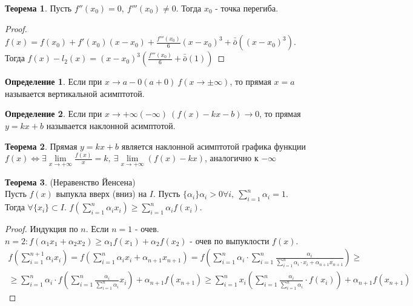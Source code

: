 \documentclass[a4paper, 12pt]{article}
\theoremstyle{definition}
\newtheorem*{definition}{Определение}
\newtheorem*{theorem}{Теорема}
\begin{document}
        \begin{theorem}
            Пусть $f''(x_0)=0,\ f'''(x_0)\ne 0$. Тогда $x_0$ - точка перегиба.
        \end{theorem} 
        \begin{proof}
            $f(x)=f(x_0)+f'(x_0)(x-x_0)+\frac{f'''(x_0)}{6}(x-x_0)^3+\bar{\bar{o}}{((x-x_0)^3)}$. Тогда $f(x)-l_2(x)=(x-x_0)^3(\frac{f'''(x_0)}{6}+\bar{\bar{o}}{(1)})$
        \end{proof} 
        \begin{definition}
            Если при $x\to a-0 (a+0)\ f(x\to \pm \infty)$, то прямая $x=a$ называется вертикальной асимптотой.
        \end{definition} 
        \begin{definition}
            Если при $x\to +\infty (-\infty)\ (f(x)-kx-b)\to 0$, то прямая $y=kx+b$ называется наклонной асимптотой.
        \end{definition} 
        \begin{theorem}
            Прямая $y=kx+b$ является наклонной асимптотой графика функции $f(x) \Leftrightarrow \exists \lim\limits_{x\to +\infty}\frac{f(x)}{x}=k,\ \exists \lim\limits_{x\to +\infty}(f(x)-kx)$, аналогично к $-\infty$
        \end{theorem} 
        \begin{theorem} (Неравенство Йенсена)\\
            Пусть $f(x)$ выпукла вверх (вниз) на $I$. Пусть $\{\alpha_i\} \alpha_i>0 \forall i,\ \sum\limits_{i=1}^{n}\alpha_i=1$. Тогда $\forall \{x_i\} \subset I$. $f(\sum\limits_{i=1}^{n}\alpha_i x_i) \geq \sum\limits_{i=1}^{n}\alpha_i f(x_i)$.
        \end{theorem} 
        \begin{proof}
            Индукция по $n$. Если $n=1$ - очев.\\
            $n=2: f(\alpha_1 x_1+\alpha_2 x_2)\geq \alpha_1 f(x_1)+\alpha_2 f(x_2)$ - очев по выпуклости $f(x)$.
            \begin{multline*}
                f(\sum\limits_{i=1}^{n+1}\alpha_i x_i)=f(\sum\limits_{i=1}^{n}\alpha_i x_i +\alpha_{n+1}x_{n+1})=f(\sum\limits_{i=1}^{n}\alpha_i \cdot \sum\limits_{i=1}^{n}\frac{\alpha_i}{\sum\limits_{i=1}^{n}\alpha_i\cdot x_i +\alpha_{n+1} x_{n+1}})\geq\\\geq \sum\limits_{i=1}^{n}\alpha_i\cdot f(\sum\limits_{i=1}^{n}\frac{\alpha_i}{\sum\limits_{i=1}^{n}\alpha_i} x_i)+\alpha_{n+1} f(x_{n+1})\geq \sum\limits_{i=1}^{n}x_i (\sum\limits_{i=1}^{n}\frac{\alpha_i}{\sum\limits_{i=1}^{n}\alpha_i}\cdot f(x_i))+\alpha_{n+1} f(x_{n+1})
            \end{multline*}
        \end{proof} 
\end{document}
